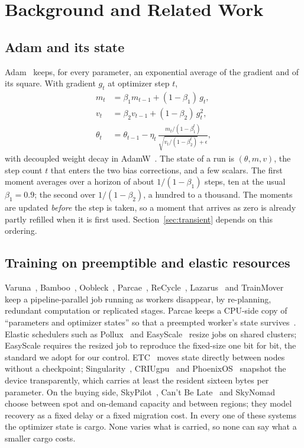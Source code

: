 \section{Background and Related Work}
\label{sec:related}

\subsection{Adam and its state}

Adam~\cite{kingma2015adam} keeps, for every parameter, an exponential average of the gradient and of its square. With
gradient $g_t$ at optimizer step $t$,
\begin{align}
m_t &= \beta_1 m_{t-1} + (1-\beta_1)\, g_t, \label{eq:m}\\
v_t &= \beta_2 v_{t-1} + (1-\beta_2)\, g_t^2, \label{eq:v}\\
\theta_t &= \theta_{t-1} - \eta_t\, \frac{m_t/(1-\beta_1^{t})}{\sqrt{v_t/(1-\beta_2^{t})} + \epsilon},  \label{eq:step}
\end{align}
with decoupled weight decay in AdamW~\cite{loshchilov2019adamw}. The state of a run is $(\theta, m, v)$, the step
count $t$ that enters the two bias corrections, and a few scalars. The first moment averages over a horizon of about
$1/(1-\beta_1)$ steps, ten at the usual $\beta_1 = 0.9$; the second over $1/(1-\beta_2)$, a hundred to a thousand.
The moments are updated \emph{before} the step is taken, so a moment that arrives as zero is already partly refilled
when it is first used. Section~\ref{sec:transient} depends on this ordering.

\subsection{Training on preemptible and elastic resources}

Varuna~\cite{athlur2022varuna}, Bamboo~\cite{thorpe2023bamboo}, Oobleck~\cite{jang2023oobleck},
Parcae~\cite{duan2024parcae}, ReCycle~\cite{gandhi2024recycle}, Lazarus~\cite{wu2024lazarus} and TrainMover~\cite{lao2024trainmover} keep a pipeline-parallel
job running as workers disappear, by re-planning, redundant computation or replicated stages. Parcae keeps a CPU-side
copy of ``parameters and optimizer states'' so that a preempted worker's state survives~\cite{duan2024parcae}.
Elastic schedulers such as Pollux~\cite{qiao2021pollux} and EasyScale~\cite{li2023easyscale} resize jobs on shared
clusters; EasyScale requires the resized job to reproduce the fixed-size one bit for bit, the standard we adopt
for our control. ETC~\cite{liu2026etc} moves state directly between nodes without a checkpoint; Singularity~\cite{shukla2022singularity}, CRIUgpu~\cite{stoyanov2025criugpu} and
PhoenixOS~\cite{wei2025phoenixos} snapshot the device transparently, which carries at least the resident sixteen bytes
per parameter. On the buying side, SkyPilot~\cite{yang2023skypilot}, Can't Be Late~\cite{wu2024cantbelate} and
SkyNomad~\cite{li2026skynomad} choose between spot and on-demand capacity and between regions; they model recovery as a
fixed delay or a fixed migration cost. In every one of these systems the optimizer state is cargo. None varies what is
carried, so none can say what a smaller cargo costs.

